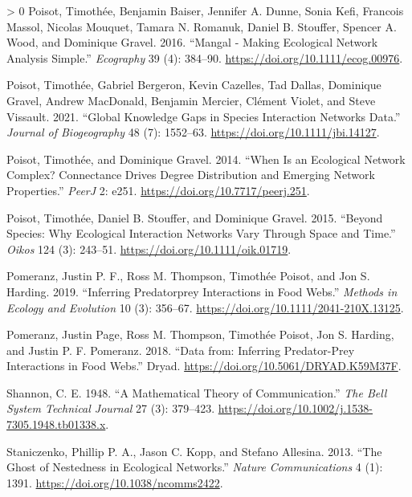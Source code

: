 \documentclass[11pt]{article}
\newlength{\cslhangindent}
\newenvironment{CSLReferences}[3] %
 {%
  \setlength{\parindent}{0pt}
  \ifodd #1 \everypar{\setlength{\hangindent}{\cslhangindent}}\ignorespaces\fi
  \ifnum #2 > 0
  \setlength{\parskip}{#2\baselineskip}
  \fi
 }%
 {}
\begin{document}
\begin{CSLReferences}{1}{0}
\leavevmode\hypertarget{ref-Poisot2016ManMakb}{}%
Poisot, Timothée, Benjamin Baiser, Jennifer A. Dunne, Sonia Kefi,
Francois Massol, Nicolas Mouquet, Tamara N. Romanuk, Daniel B. Stouffer,
Spencer A. Wood, and Dominique Gravel. 2016. {``Mangal - Making
Ecological Network Analysis Simple.''} \emph{Ecography} 39 (4): 384--90.
\url{https://doi.org/10.1111/ecog.00976}.

\leavevmode\hypertarget{ref-Poisot2021GloKno}{}%
Poisot, Timothée, Gabriel Bergeron, Kevin Cazelles, Tad Dallas,
Dominique Gravel, Andrew MacDonald, Benjamin Mercier, Clément Violet,
and Steve Vissault. 2021. {``Global Knowledge Gaps in Species
Interaction Networks Data.''} \emph{Journal of Biogeography} 48 (7):
1552--63. \url{https://doi.org/10.1111/jbi.14127}.

\leavevmode\hypertarget{ref-Poisot2014WheEcoa}{}%
Poisot, Timothée, and Dominique Gravel. 2014. {``When Is an Ecological
Network Complex? Connectance Drives Degree Distribution and Emerging
Network Properties.''} \emph{PeerJ} 2: e251.
\url{https://doi.org/10.7717/peerj.251}.

\leavevmode\hypertarget{ref-Poisot2015SpeWhya}{}%
Poisot, Timothée, Daniel B. Stouffer, and Dominique Gravel. 2015.
{``Beyond Species: Why Ecological Interaction Networks Vary Through
Space and Time.''} \emph{Oikos} 124 (3): 243--51.
\url{https://doi.org/10.1111/oik.01719}.

\leavevmode\hypertarget{ref-Pomeranz2019InfPrea}{}%
Pomeranz, Justin P. F., Ross M. Thompson, Timothée Poisot, and Jon S.
Harding. 2019. {``Inferring Predatorprey Interactions in Food Webs.''}
\emph{Methods in Ecology and Evolution} 10 (3): 356--67.
\url{https://doi.org/10.1111/2041-210X.13125}.

\leavevmode\hypertarget{ref-Pomeranz2018DatInf}{}%
Pomeranz, Justin Page, Ross M. Thompson, Timothée Poisot, Jon S.
Harding, and Justin P. F. Pomeranz. 2018. {``Data from: Inferring
Predator-Prey Interactions in Food Webs.''} Dryad.
\url{https://doi.org/10.5061/DRYAD.K59M37F}.

\leavevmode\hypertarget{ref-Shannon1948MatThe}{}%
Shannon, C. E. 1948. {``A Mathematical Theory of Communication.''}
\emph{The Bell System Technical Journal} 27 (3): 379--423.
\url{https://doi.org/10.1002/j.1538-7305.1948.tb01338.x}.

\leavevmode\hypertarget{ref-Staniczenko2013GhoNes}{}%
Staniczenko, Phillip P. A., Jason C. Kopp, and Stefano Allesina. 2013.
{``The Ghost of Nestedness in Ecological Networks.''} \emph{Nature
Communications} 4 (1): 1391. \url{https://doi.org/10.1038/ncomms2422}.


\end{CSLReferences}
\end{document}
